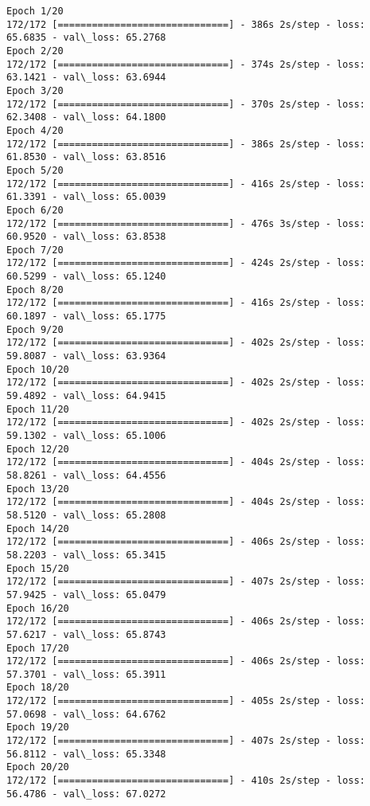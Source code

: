 \documentclass[11pt]{article}
\begin{document}
    \begin{Verbatim}[commandchars=\\\{\}]
Epoch 1/20
172/172 [==============================] - 386s 2s/step - loss: 65.6835 - val\_loss: 65.2768
Epoch 2/20
172/172 [==============================] - 374s 2s/step - loss: 63.1421 - val\_loss: 63.6944
Epoch 3/20
172/172 [==============================] - 370s 2s/step - loss: 62.3408 - val\_loss: 64.1800
Epoch 4/20
172/172 [==============================] - 386s 2s/step - loss: 61.8530 - val\_loss: 63.8516
Epoch 5/20
172/172 [==============================] - 416s 2s/step - loss: 61.3391 - val\_loss: 65.0039
Epoch 6/20
172/172 [==============================] - 476s 3s/step - loss: 60.9520 - val\_loss: 63.8538
Epoch 7/20
172/172 [==============================] - 424s 2s/step - loss: 60.5299 - val\_loss: 65.1240
Epoch 8/20
172/172 [==============================] - 416s 2s/step - loss: 60.1897 - val\_loss: 65.1775
Epoch 9/20
172/172 [==============================] - 402s 2s/step - loss: 59.8087 - val\_loss: 63.9364
Epoch 10/20
172/172 [==============================] - 402s 2s/step - loss: 59.4892 - val\_loss: 64.9415
Epoch 11/20
172/172 [==============================] - 402s 2s/step - loss: 59.1302 - val\_loss: 65.1006
Epoch 12/20
172/172 [==============================] - 404s 2s/step - loss: 58.8261 - val\_loss: 64.4556
Epoch 13/20
172/172 [==============================] - 404s 2s/step - loss: 58.5120 - val\_loss: 65.2808
Epoch 14/20
172/172 [==============================] - 406s 2s/step - loss: 58.2203 - val\_loss: 65.3415
Epoch 15/20
172/172 [==============================] - 407s 2s/step - loss: 57.9425 - val\_loss: 65.0479
Epoch 16/20
172/172 [==============================] - 406s 2s/step - loss: 57.6217 - val\_loss: 65.8743
Epoch 17/20
172/172 [==============================] - 406s 2s/step - loss: 57.3701 - val\_loss: 65.3911
Epoch 18/20
172/172 [==============================] - 405s 2s/step - loss: 57.0698 - val\_loss: 64.6762
Epoch 19/20
172/172 [==============================] - 407s 2s/step - loss: 56.8112 - val\_loss: 65.3348
Epoch 20/20
172/172 [==============================] - 410s 2s/step - loss: 56.4786 - val\_loss: 67.0272

    \end{Verbatim}
\end{document}
